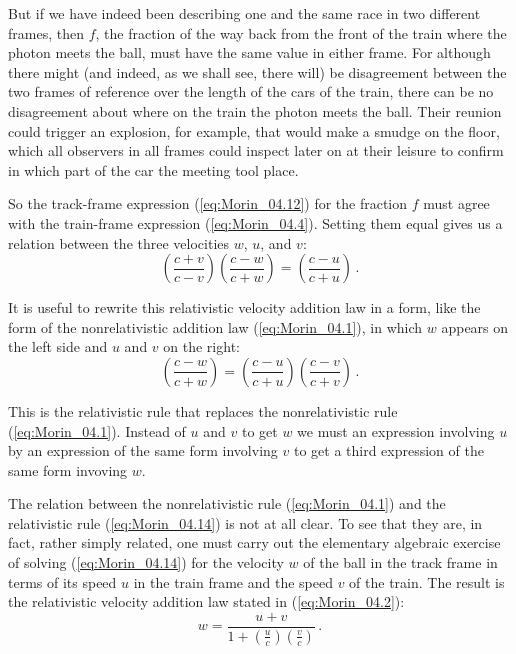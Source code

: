 But if we have indeed been describing one and the same race in two different frames, then $f$, the fraction of the way back from the front of the train where the photon meets the ball, must have the same value in either frame. For although there might (and indeed, as we shall see, there will) be disagreement between the two frames of reference over the length of the cars of the train, there can be no disagreement about where on the train the photon meets the ball. Their reunion could trigger an explosion, for example, that would make a smudge on the floor, which all observers in all frames could inspect later on at their leisure to confirm in which part of the car the meeting tool place. 

So the track-frame expression (\ref{eq:Morin_04.12}) for the fraction $f$ must agree with the train-frame expression (\ref{eq:Morin_04.4}). Setting them equal gives us a relation between the three velocities $w$, $u$, and $v$:
\begin{equation}\label{eq:Morin_04.13}
\left( \frac{c + v}{c - v} \right)\left( \frac{c - w}{c + w} \right) = \left( \frac{c - u}{c + u} \right)\,.
\end{equation}

It is useful to rewrite this relativistic velocity addition law in a form, like the form of the nonrelativistic addition law (\ref{eq:Morin_04.1}), in which $w$ appears on the left side and $u$ and $v$ on the right:
\begin{equation}\label{eq:Morin_04.14}
\left( \frac{c - w}{c + w} \right) = \left( \frac{c - u}{c + u} \right)  \left( \frac{c - v}{c + v} \right)\,.
\end{equation}

This is the relativistic rule that replaces the nonrelativistic rule (\ref{eq:Morin_04.1}). Instead of  $u$ and $v$ to get $w$ we must  an expression involving $u$ by an expression of the same form involving $v$ to get a third expression of the same form invoving $w$. 

The relation between the nonrelativistic rule (\ref{eq:Morin_04.1}) and the relativistic rule (\ref{eq:Morin_04.14}) is not at all clear. To see that they are, in fact, rather simply related, one must carry out the elementary algebraic exercise of solving (\ref{eq:Morin_04.14}) for the velocity $w$ of the ball in the track frame in terms of its speed $u$ in the train frame and the speed $v$ of the train. The result is the relativistic velocity addition law stated in (\ref{eq:Morin_04.2}):
\begin{equation}\label{eq:Morin_04.15}
w = \frac{u + v}{1 + \left( \frac{u}{c}\right) \left( \frac{v}{c}\right)}\,.
\end{equation}

